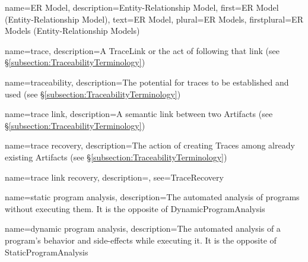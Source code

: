 {
    name={ER Model},
    description={Entity-Relationship Model},
    first={ER Model (Entity-Relationship Model)},
    text={ER Model},
    plural={ER Models},
    firstplural={ER Models (Entity-Relationship Models)}
}

{
    name={trace},
    description={A \gls{TraceLink} or the act of following that link \cite{DBLP:books/daglib/p/GotelCHZEGDAMM12} (see §\ref{subsection:TraceabilityTerminology})}
}

{
    name={traceability},
    description={The potential for traces to be established and used \cite{DBLP:books/daglib/p/GotelCHZEGDAMM12} (see §\ref{subsection:TraceabilityTerminology})}
}

{
    name={trace link},
    description={A semantic link between two \glspl{Artifact} \cite{DBLP:books/daglib/p/GotelCHZEGDAMM12} (see §\ref{subsection:TraceabilityTerminology})}
}

{
    name={trace recovery},
    description={The action of creating \glspl{Trace} among already existing \glspl{Artifact} \cite{DBLP:books/daglib/p/GotelCHZEGDAMM12} (see §\ref{subsection:TraceabilityTerminology})}
}

{
    name={trace link recovery},
    description={},
    see={TraceRecovery}
}

{
    name={static program analysis},
    description={The automated analysis of programs without executing them. It is the opposite of \gls{DynamicProgramAnalysis}}
}

{
    name={dynamic program analysis},
    description={The automated analysis of a program's behavior and side-effects while executing it. It is the opposite of \gls{StaticProgramAnalysis}}
}
